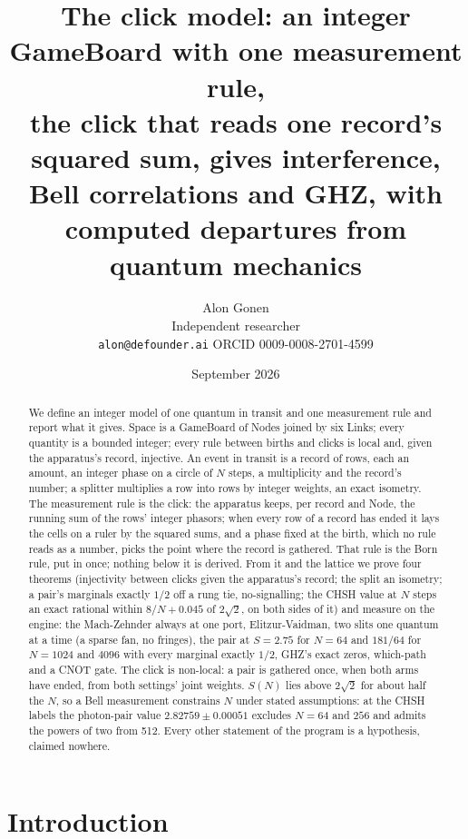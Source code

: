 \documentclass[11pt]{article}
\title{The click model: an integer GameBoard with one measurement rule,\\
the click that reads one record's squared sum, gives interference,\\
Bell correlations and GHZ, with computed departures from quantum mechanics}
\author{Alon Gonen\\
\small Independent researcher\\
\small \texttt{alon@defounder.ai} \quad ORCID 0009-0008-2701-4599}
\date{September 2026}
\theoremstyle{definition}
\begin{document}
\maketitle

\begin{abstract}
We define an integer model of one quantum in transit and one measurement
rule and report what it gives. Space is a GameBoard of Nodes
joined by six Links; every quantity is a bounded integer; every rule
between births and clicks is local and, given the apparatus's record,
injective. An event in transit is
a record of rows, each an amount, an integer phase on a circle of $N$
steps, a multiplicity and the record's number; a splitter multiplies
a row into rows by integer weights, an exact isometry. The measurement
rule is the click: the apparatus keeps, per record and Node, the running
sum of the rows' integer phasors; when every row of a record has ended it
lays the cells on a ruler by the squared sums, and a phase fixed at the
birth, which no rule reads as a number, picks the point where the record
is gathered. That rule is the Born rule, put in once; nothing
below it is derived. From it and the lattice we prove four
theorems (injectivity between clicks given the apparatus's record; the
split an isometry; a pair's marginals exactly $1/2$ off a rung tie,
no-signalling; the CHSH value at $N$ steps an exact rational within $8/N + 0.045$ of
$2\sqrt2$, on both sides of it) and measure on the
engine: the Mach-Zehnder always at one port, Elitzur-Vaidman, two slits one
quantum at a time (a sparse fan, no fringes), the pair at $S = 2.75$ for $N = 64$ and $181/64$ for
$N = 1024$ and $4096$ with every marginal exactly $1/2$, GHZ's exact
zeros, which-path and a CNOT gate. The click is non-local: a
pair is gathered once, when both arms have ended, from both settings'
joint weights. $S(N)$ lies above $2\sqrt2$ for about half the $N$,
so a Bell measurement constrains $N$ under stated assumptions: at the
CHSH labels the photon-pair value $2.82759 \pm 0.00051$ excludes
$N = 64$ and $256$ and admits the powers of two from 512. Every other
statement of the program is a hypothesis, claimed nowhere.
\end{abstract}

\section{Introduction}
\end{document}
